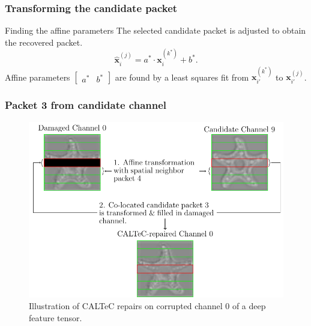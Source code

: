 \documentclass[aspectratio=169]{beamer}
\begin{document}
\begin{frame}
	\frametitle{Transforming the candidate packet}
	\begin{block}{Finding the affine parameters}
		The selected candidate packet is adjusted to obtain the recovered packet.
		\[
		\widehat{\mathbf{x}}_i^{(j)} = a^*\cdot \mathbf{x}_i^{(k^*)} + b^*.
		\label{eq:recovered_packet}
		\]
		Affine parameters $\begin{bmatrix}a^*&b^* \end{bmatrix}$ are found by a least squares fit from $\mathbf{x}_{i'}^{(k^*)}$ to $\mathbf{x}_{i'}^{(j)}$.
	\end{block}
\end{frame}


\begin{frame}
	\frametitle{Packet 3 from candidate channel}
	\begin{figure}[H]
		\centering
		\includegraphics[scale=0.56]{lumimapcaltecnicer1.pdf}
		\caption{Illustration of CALTeC repairs on corrupted channel 0 of a deep feature tensor.}
	\end{figure}
\end{frame}
\end{document}
